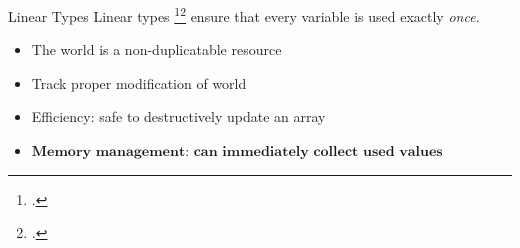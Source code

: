\documentclass[aspectratio=169]{beamer}
\begin{document}
\begin{frame}{Linear Types}
    Linear types \footcite{girard_linear_1987}\footcite{wadler_linear_1990} ensure that every variable is used exactly \emph{once}.
    \begin{itemize}[<+->]
        \item The \alert{world} is a non-duplicatable resource %
        \item Track proper modification of world %
        \item Efficiency: safe to destructively update an array
        \item $\textbf{Memory management: can immediately collect used values}$ %
    \end{itemize}
\end{frame}

\end{document}
